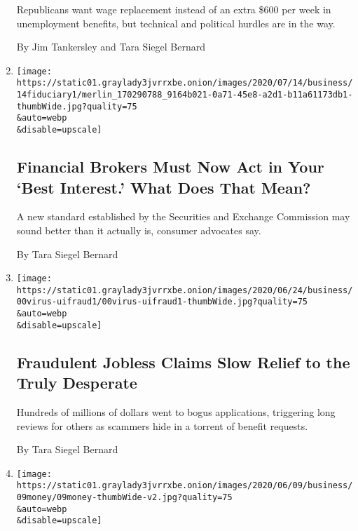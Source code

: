 \begin{enumerate}
  Republicans want wage replacement instead of an extra \$600 per week
  in unemployment benefits, but technical and political hurdles are in
  the way.

  By Jim Tankersley and Tara Siegel Bernard
\item
  \href{/2020/07/16/your-money/fiduciary-duty-investments-best-interest.html}{}

  \texttt{[image: https://static01.graylady3jvrrxbe.onion/images/2020/07/14/business/14fiduciary1/merlin\_170290788\_9164b021-0a71-45e8-a2d1-b11a61173db1-thumbWide.jpg?quality=75\\\&auto=webp\\\&disable=upscale]}

  \hypertarget{financial-brokers-must-now-act-in-your-best-interest-what-does-that-mean}{%
  \subsection{Financial Brokers Must Now Act in Your `Best Interest.'
  What Does That
  Mean?}\label{financial-brokers-must-now-act-in-your-best-interest-what-does-that-mean}}

  A new standard established by the Securities and Exchange Commission
  may sound better than it actually is, consumer advocates say.

  By Tara Siegel Bernard
\item
  \href{/2020/07/02/your-money/coronavirus-unemployment-fraud.html}{}

  \texttt{[image: https://static01.graylady3jvrrxbe.onion/images/2020/06/24/business/00virus-uifraud1/00virus-uifraud1-thumbWide.jpg?quality=75\\\&auto=webp\\\&disable=upscale]}

  \hypertarget{fraudulent-jobless-claims-slow-relief-to-the-truly-desperate}{%
  \subsection{Fraudulent Jobless Claims Slow Relief to the Truly
  Desperate}\label{fraudulent-jobless-claims-slow-relief-to-the-truly-desperate}}

  Hundreds of millions of dollars went to bogus applications, triggering
  long reviews for others as scammers hide in a torrent of benefit
  requests.

  By Tara Siegel Bernard
\item
  \href{/2020/06/09/your-money/race-income-equality.html}{}

  \texttt{[image: https://static01.graylady3jvrrxbe.onion/images/2020/06/09/business/09money/09money-thumbWide-v2.jpg?quality=75\\\&auto=webp\\\&disable=upscale]}


\end{enumerate}
